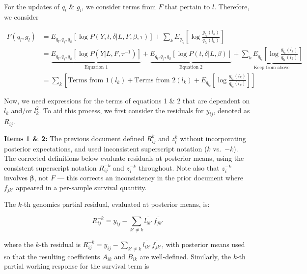 \documentclass{article}[12pt]
\begin{document}
For the updates of $q_l$ \& $g_l$, we consider terms from $F$ that pertain to $l$. Therefore, we consider

\begin{align}
    F\left(q_l, g_l\right) &= E_{q_l, q_f, q_{\beta}}\left[\log P\left(Y, t, \delta \vert L, F, \beta, \tau\right)\right] + \sum_{k}E_{q_{l_k}}\left[\log \frac{g_{l_k}(l_k)}{q_{l_k}(l_k)}\right]\\
    &= \underbrace{E_{q_l, q_f, q_{\beta}}\left[\log P\left(Y \vert L, F, \tau^{-1}\right)\right]}_{\text{Equation 1}} + \underbrace{E_{q_l, q_f, q_{\beta}}\left[\log P\left(t, \delta \vert L, \beta\right)\right]}_{\text{Equation 2}} + \underbrace{\sum_{k}E_{q_{l_k}}\left[\log \frac{g_{l_k}(l_k)}{q_{l_k}(l_k)}\right]}_{\text{Keep from above}}\\
    &= \sum_{k}\left[\text{Terms from 1}(l_k) + \text{Terms from 2}(l_k) + E_{q_{l_k}}\left[\log \frac{g_{l_k}(l_k)}{q_{l_k}(l_k)}\right]\right]\label{SumTerm1:Term2}
\end{align}

Now, we need expressions for the terms of equations 1 \& 2 that are dependent on $l_k$ and/or $l_{k}^{2}$. To aid this process, we first consider the residuals for $y_{ij}$, denoted as $R_{ij}$.

\begin{corrbox}
\textbf{Items 1 \& 2:} The previous document defined $R^{k}_{ij}$ and $z^{k}_{i}$ without
incorporating posterior expectations, and used inconsistent superscript notation
($k$ vs.\ $-k$). The corrected definitions below evaluate residuals at
posterior means, using the consistent superscript notation $R^{-k}_{ij}$
and $z^{-k}_{i}$ throughout. Note also that $z^{-k}_{i}$ involves $\bm{\beta}$,
not $F$ --- this corrects an inconsistency in the prior document where
$f_{jk'}$ appeared in a per-sample survival quantity.
\end{corrbox}

\medskip
The $k$-th genomics partial residual, evaluated at posterior means, is:

\begin{equation}\label{eq:Rk}
    R^{-k}_{ij} = y_{ij} - \sum_{k'\neq k}\overline{l_{ik'}}\,\overline{f_{jk'}}
\end{equation}

where the $k$-th residual is $R^{-k}_{ij} = y_{ij}-\sum_{k'\neq k} \overline{l_{ik'}}\,\overline{f_{jk'}}$, with posterior means used so that the resulting coefficients $A_{ik}$ and $B_{ik}$ are well-defined. Similarly, the $k$-th partial working response for the survival term is
\end{document}
